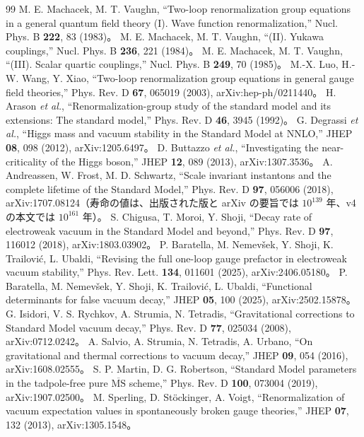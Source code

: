 \documentclass[a4paper,10pt]{ltjsarticle}
\begin{document}
\begin{thebibliography}{99}
 M. E. Machacek, M. T. Vaughn, ``Two-loop renormalization group equations in a general quantum field theory (I). Wave function renormalization,'' Nucl. Phys. B \textbf{222}, 83 (1983)。
 M. E. Machacek, M. T. Vaughn, ``(II). Yukawa couplings,'' Nucl. Phys. B \textbf{236}, 221 (1984)。
 M. E. Machacek, M. T. Vaughn, ``(III). Scalar quartic couplings,'' Nucl. Phys. B \textbf{249}, 70 (1985)。
 M.-X. Luo, H.-W. Wang, Y. Xiao, ``Two-loop renormalization group equations in general gauge field theories,'' Phys. Rev. D \textbf{67}, 065019 (2003), arXiv:hep-ph/0211440。
 H. Arason \textit{et al.}, ``Renormalization-group study of the standard model and its extensions: The standard model,'' Phys. Rev. D \textbf{46}, 3945 (1992)。
 G. Degrassi \textit{et al.}, ``Higgs mass and vacuum stability in the Standard Model at NNLO,'' JHEP \textbf{08}, 098 (2012), arXiv:1205.6497。
 D. Buttazzo \textit{et al.}, ``Investigating the near-criticality of the Higgs boson,'' JHEP \textbf{12}, 089 (2013), arXiv:1307.3536。
 A. Andreassen, W. Frost, M. D. Schwartz, ``Scale invariant instantons and the complete lifetime of the Standard Model,'' Phys. Rev. D \textbf{97}, 056006 (2018), arXiv:1707.08124（寿命の値は、出版された版と arXiv の要旨では $10^{139}$ 年、v4 の本文では $10^{161}$ 年）。
 S. Chigusa, T. Moroi, Y. Shoji, ``Decay rate of electroweak vacuum in the Standard Model and beyond,'' Phys. Rev. D \textbf{97}, 116012 (2018), arXiv:1803.03902。
 P. Baratella, M. Nemevšek, Y. Shoji, K. Trailović, L. Ubaldi, ``Revising the full one-loop gauge prefactor in electroweak vacuum stability,'' Phys. Rev. Lett. \textbf{134}, 011601 (2025), arXiv:2406.05180。
 P. Baratella, M. Nemevšek, Y. Shoji, K. Trailović, L. Ubaldi, ``Functional determinants for false vacuum decay,'' JHEP \textbf{05}, 100 (2025), arXiv:2502.15878。
 G. Isidori, V. S. Rychkov, A. Strumia, N. Tetradis, ``Gravitational corrections to Standard Model vacuum decay,'' Phys. Rev. D \textbf{77}, 025034 (2008), arXiv:0712.0242。
 A. Salvio, A. Strumia, N. Tetradis, A. Urbano, ``On gravitational and thermal corrections to vacuum decay,'' JHEP \textbf{09}, 054 (2016), arXiv:1608.02555。
 S. P. Martin, D. G. Robertson, ``Standard Model parameters in the tadpole-free pure $\overline{\mathrm{MS}}$ scheme,'' Phys. Rev. D \textbf{100}, 073004 (2019), arXiv:1907.02500。
 M. Sperling, D. Stöckinger, A. Voigt, ``Renormalization of vacuum expectation values in spontaneously broken gauge theories,'' JHEP \textbf{07}, 132 (2013), arXiv:1305.1548。

\end{thebibliography}
\end{document}

